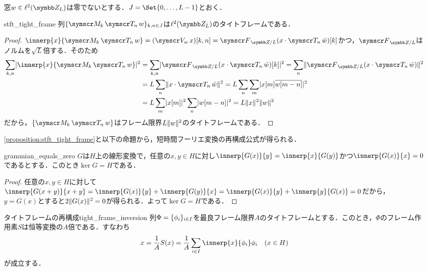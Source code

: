 \documentclass[../../main]{subfiles}
\begin{document}
窓\(w\in\cycles{L}\)は零でないとする．\(J=\Set{0,\dots,L-1}\)とおく．

\begin{proposition}{}{stft_tight_frame}
  列\(\seq{\modulate{k}\translate{n}w}_{k,n\in J}\)は\(\cycles{L}\)のタイトフレームである．
\end{proposition}

\begin{proof}
  \(\innerp{x}{\modulate{k}\translate{n}w}=(\stft{w}x)[k,n]=\dft{L}(x\cdot\translate{n}\conj{w})[k]\)かつ，\(\dft{L}\)はノルムを\(\sqrt{L}\)倍する．そのため
  \begin{align*}
    \sum_{k,n}\abs{\innerp{x}{\modulate{k}\translate{n}w}}^2 &= \sum_{k,n}\abs{\dft{L}(x\cdot\translate{n}\conj{w})[k]}^2
    = \sum_n\vnorm{\dft{L}(x\cdot\translate{n}\conj{w})}^2 \\
    &= L\sum_n\vnorm{x\cdot\translate{n}\conj{w}}^2
    = L\sum_n\sum_m\abs{x[m]\conj*{w[m-n]}}^2 \\
    &= L\sum_m\abs{x[m]}^2\sum_n\abs{w[m-n]}^2
    = L\vnorm{x}^2\vnorm{w}^2
  \end{align*}
  だから，\(\seq{\modulate{k}\translate{n}w}\)はフレーム限界\(L\lVert w\rVert^2\)のタイトフレームである．
\end{proof}

\cref{proposition:stft_tight_frame}と以下の命題から，短時間フーリエ変換の再構成公式が得られる．

\begin{lemma}{}{grammian_equals_zero}
  \(G\)は\(H\)上の線形変換で，任意の\(x,y\in H\)に対し\(\innerp{G(x)}{y}=\innerp{x}{G(y)}\)かつ\(\innerp{G(x)}{x}=0\)であるとする．このとき\(\ker G=H\)である．
\end{lemma}

\begin{proof}
  任意の\(x,y\in H\)に対して\(\innerp{G(x+y)}{x+y}=\innerp{G(x)}{y}+\innerp{G(y)}{x}=\innerp{G(x)}{y}+\innerp{y}{G(x)}=0\)だから，
  \(y=G(x)\)とすると\(2\lVert G(x)\rVert^2=0\)が得られる．よって\(\ker G=H\)である．
\end{proof}

\begin{proposition}{タイトフレームの再構成}{tight_frame_inversion}
  列\(\Phi=\lbrace\phi_i\rbrace_{i\in I}\)を最良フレーム限界\(A\)のタイトフレームとする．このとき，\(\Phi\)のフレーム作用素\(S\)は恒等変換の\(A\)倍である．すなわち
  \[
    x = \frac{1}{A}S(x)
    = \frac{1}{A}\sum_{i\in I}\innerp{x}{\phi_i}\phi_i\quad(x\in H)
  \]
  が成立する．
\end{proposition}
\end{document}
